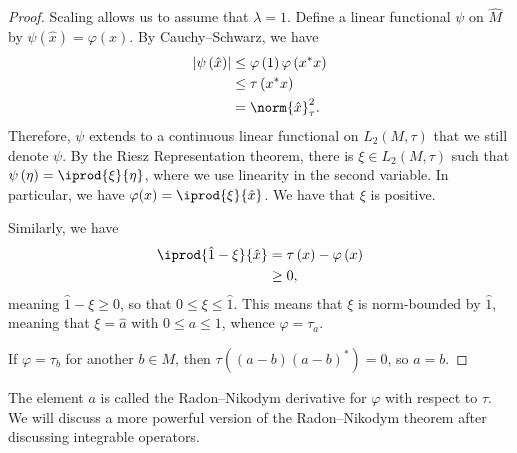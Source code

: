\documentclass[10pt]{mypackage}
\begin{document}
\begin{proof}
  Scaling allows us to assume that $\lambda = 1$. Define a linear functional $\psi$ on $ \widehat{M} $ by $\psi\left( \hat{x} \right) = \varphi(x)$. By Cauchy--Schwarz, we have
  \begin{align*}
    \left\vert \psi\left( \hat{x} \right) \right\vert &\leq \varphi\left( 1 \right)\varphi\left( x^{\ast}x \right)\\
                                                      &\leq \tau\left( x^{\ast}x \right)\\
                                                      &= \norm{\hat{x}}_{\tau}^2.
  \end{align*}
  Therefore, $\psi$ extends to a continuous linear functional on $L_2\left( M,\tau \right)$ that we still denote $\psi$. By the Riesz Representation theorem, there is $\xi\in L_2\left( M,\tau \right)$ such that $\psi\left( \eta \right) = \iprod{\xi}{\eta}$, where we use linearity in the second variable. In particular, we have $\varphi(x) = \iprod{\xi}{\hat{x}}$. We have that $\xi$ is positive.

  Similarly, we have
  \begin{align*}
    \iprod{\hat{1}-\xi}{\hat{x}} &= \tau\left( x \right)-\varphi\left( x \right)\\
                                 &\geq 0,
  \end{align*}
  meaning $\hat{1}-\xi \geq 0$, so that $0\leq \xi\leq \hat{1}$. This means that $\xi$ is norm-bounded by $\hat{1}$, meaning that $\xi = \hat{a}$ with $0\leq a \leq 1$, whence $\varphi = \tau_a$.

  If $\varphi = \tau_b$ for another $b\in M$, then $\tau\left( \left( a-b \right)\left( a-b \right)^{\ast} \right) = 0$, so $a = b$.
\end{proof}
The element $a$ is called the Radon--Nikodym derivative for $\varphi$ with respect to $\tau$. We will discuss a more powerful version of the Radon--Nikodym theorem after discussing integrable operators.
\end{document}
